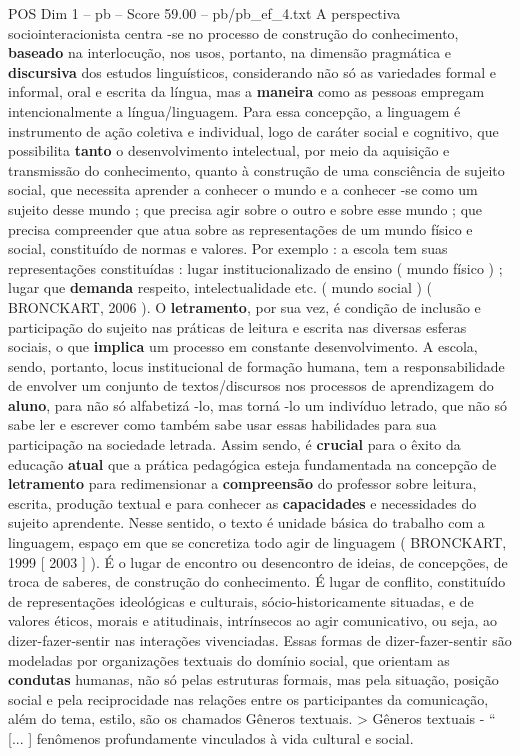 \begin{textsample}{POS Dim 1 – pb – Score 59.00 – pb/pb\_ef\_4.txt}
A perspectiva sociointeracionista centra -se no processo de construção do conhecimento, \textbf{baseado} na interlocução, nos usos, portanto, na dimensão pragmática e \textbf{discursiva} dos estudos linguísticos, considerando não só as variedades formal e informal, oral e escrita da língua, mas a \textbf{maneira} como as pessoas empregam intencionalmente a língua/linguagem.
Para essa concepção, a linguagem é instrumento de ação coletiva e individual, logo de caráter social e cognitivo, que possibilita \textbf{tanto} o desenvolvimento intelectual, por meio da aquisição e transmissão do conhecimento, quanto à construção de uma consciência de sujeito social, que necessita aprender a conhecer o mundo e a conhecer -se como um sujeito desse mundo ; que precisa agir sobre o outro e sobre esse mundo ; que precisa compreender que atua sobre as representações de um mundo físico e social, constituído de normas e valores.
Por exemplo : a escola tem suas representações constituídas : lugar institucionalizado de ensino ( mundo físico ) ; lugar que \textbf{demanda} respeito, intelectualidade etc. ( mundo social ) ( BRONCKART, 2006 ).
O \textbf{letramento}, por sua vez, é condição de inclusão e participação do sujeito nas práticas de leitura e escrita nas diversas esferas sociais, o que \textbf{implica} um processo em constante desenvolvimento.
A escola, sendo, portanto, locus institucional de formação humana, tem a responsabilidade de envolver um conjunto de textos/discursos nos processos de aprendizagem do \textbf{aluno}, para não só alfabetizá -lo, mas torná -lo um indivíduo letrado, que não só sabe ler e escrever como também sabe usar essas habilidades para sua participação na sociedade letrada.
Assim sendo, é \textbf{crucial} para o êxito da educação \textbf{atual} que a prática pedagógica esteja fundamentada na concepção de \textbf{letramento} para redimensionar a \textbf{compreensão} do professor sobre leitura, escrita, produção textual e para conhecer as \textbf{capacidades} e necessidades do sujeito aprendente.
Nesse sentido, o texto é unidade básica do trabalho com a linguagem, espaço em que se concretiza todo agir de linguagem ( BRONCKART, 1999 [ 2003 ] ).
É o lugar de encontro ou desencontro de ideias, de concepções, de troca de saberes, de construção do conhecimento.
É lugar de conflito, constituído de representações ideológicas e culturais, sócio-historicamente situadas, e de valores éticos, morais e atitudinais, intrínsecos ao agir comunicativo, ou seja, ao dizer-fazer-sentir nas interações vivenciadas.
Essas formas de dizer-fazer-sentir são modeladas por organizações textuais do domínio social, que orientam as \textbf{condutas} humanas, não só pelas estruturas formais, mas pela situação, posição social e pela reciprocidade nas relações entre os participantes da comunicação, além do tema, estilo, são os chamados Gêneros textuais. > Gêneros textuais - “ [... ] fenômenos profundamente vinculados à vida cultural e social.

\end{textsample}
